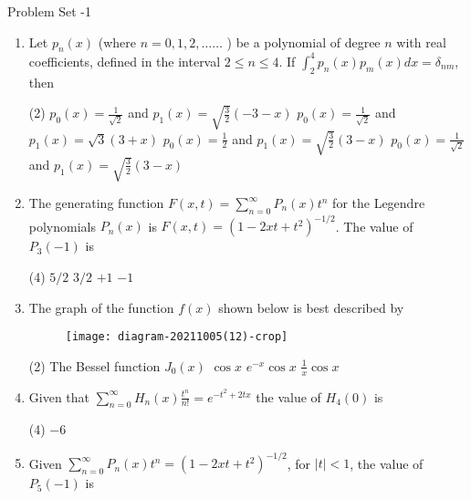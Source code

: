 \newpage
\begin{abox}
	Problem Set -1
\end{abox}
\begin{enumerate}[label=\color{ocre}\textbf{\arabic*.}]
	\item  Let $p_{n}(x)$ (where $n=0,1,2, \ldots \ldots$ ) be a polynomial of degree $n$ with real coefficients, defined in the interval $2 \leq n \leq 4$. If $\int_{2}^{4} p_{n}(x) p_{m}(x) d x=\delta_{n m}$, then
	{}
	\begin{tasks}(2)
		\task[\textbf{A.}] $p_{0}(x)=\frac{1}{\sqrt{2}}$ and $p_{1}(x)=\sqrt{\frac{3}{2}}(-3-x)$
		\task[\textbf{B.}]  $p_{0}(x)=\frac{1}{\sqrt{2}}$ and $p_{1}(x)=\sqrt{3}(3+x)$
		\task[\textbf{C.}] $p_{0}(x)=\frac{1}{2}$ and $p_{1}(x)=\sqrt{\frac{3}{2}}(3-x)$
		\task[\textbf{D.}] $p_{0}(x)=\frac{1}{\sqrt{2}}$ and $p_{1}(x)=\sqrt{\frac{3}{2}}(3-x)$
	\end{tasks}
	\item  The generating function $F(x, t)=\sum_{n=0}^{\infty} P_{n}(x) t^{n}$ for the Legendre polynomials $P_{n}(x)$ is $F(x, t)=\left(1-2 x t+t^{2}\right)^{-1 / 2}$. The value of $P_{3}(-1)$ is
	{}
	\begin{tasks}(4)
		\task[\textbf{A.}] $5 / 2$
		\task[\textbf{B.}] $3 / 2$
		\task[\textbf{C.}] $+1$
		\task[\textbf{D.}] $-1$
	\end{tasks}
	\item  The graph of the function $f(x)$ shown below is best described by
	{}
	\begin{figure}[H]
		\centering
		\texttt{[image: diagram-20211005(12)-crop]}
	\end{figure}
	\begin{tasks}(2)
		\task[\textbf{A.}]  The Bessel function $J_{0}(x)$
		\task[\textbf{B.}] $\cos x$
		\task[\textbf{C.}] $e^{-x} \cos x$
		\task[\textbf{D.}] $\frac{1}{x} \cos x$
	\end{tasks}
	\item Given that $\sum_{n=0}^{\infty} H_{n}(x) \frac{t^{n}}{n !}=e^{-t^{2}+2 t x}$ the value of $H_{4}(0)$ is
	{}
	\begin{tasks}(4)
		\task[\textbf{D.}] $-6$
	\end{tasks}
	\item   Given $\sum_{n=0}^{\infty} P_{n}(x) t^{n}=\left(1-2 x t+t^{2}\right)^{-1 / 2}$, for $|t|<1$, the value of $P_{5}(-1)$ is

\end{enumerate}
